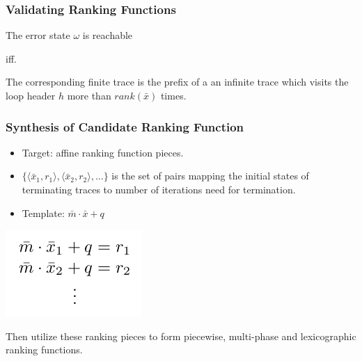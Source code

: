 \documentclass[11pt]{beamer}
\begin{document}
\begin{frame}\frametitle{Validating Ranking Functions}

\begin{theorem}
The error state $\omega$ is reachable 

iff.

The corresponding finite trace is the prefix of a an infinite trace which visits the loop header $h$ more than $rank(\bar{x})$ times.
\end{theorem}

\end{frame}


\begin{frame}\frametitle{Synthesis of Candidate Ranking Function}

\begin{itemize}

\item Target: affine ranking function pieces.

\item $\{\langle\bar{x}_1, r_1\rangle, \langle \bar{x}_2, r_2\rangle, \ldots\}$ is the set of pairs mapping the initial states of terminating traces to number of iterations need for termination.

\item Template: $\bar{m}\cdot \bar{x} + q$
\end{itemize}
\begin{center}
\includegraphics[scale=0.4]{affine.png}
\end{center}

Then utilize these ranking pieces to form piecewise, multi-phase and lexicographic ranking functions.

\end{frame}
\end{document}
